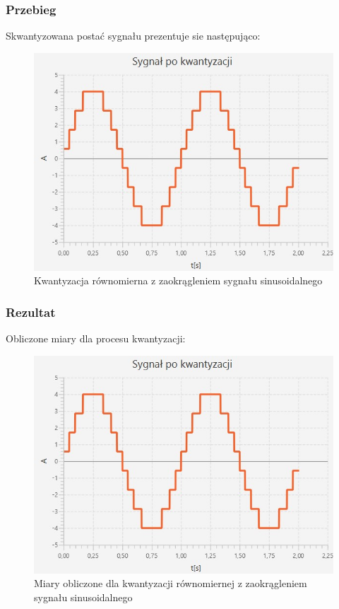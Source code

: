 \documentclass[12pt]{article}
\begin{document}
\subsubsection{Przebieg}
Skwantyzowana postać sygnału prezentuje sie następująco:
\begin{figure}[H]
	\centering
	\includegraphics[width=\linewidth]{sygnal_kwantyzacja_z_zaokragleniem.jpg}
	\caption{Kwantyzacja równomierna z zaokrągleniem sygnału sinusoidalnego}
	\label{wykres dla eksperymentu 2}
\end{figure}

\subsubsection{Rezultat}
Obliczone miary dla procesu kwantyzacji:
\begin{figure}[H]
	\centering
	\includegraphics[width=\linewidth]{sygnal_kwantyzacja_z_zaokragleniem.jpg}
	\caption{Miary obliczone dla kwantyzacji równomiernej z zaokrągleniem sygnału sinusoidalnego}
	\label{Wartości dla eksperymentu 2}
\end{figure}
\end{document}
